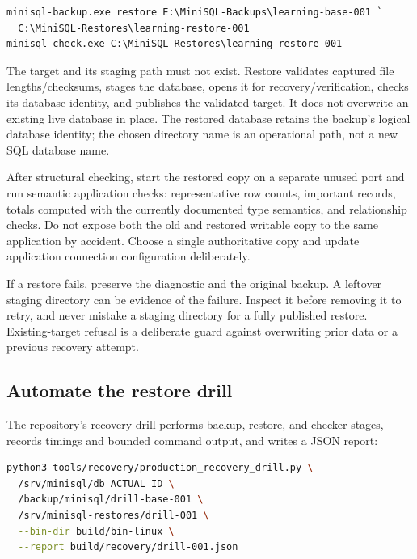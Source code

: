\begin{lstlisting}
minisql-backup.exe restore E:\MiniSQL-Backups\learning-base-001 `
  C:\MiniSQL-Restores\learning-restore-001
minisql-check.exe C:\MiniSQL-Restores\learning-restore-001
\end{lstlisting}

The target and its  staging path must not exist. Restore
validates captured file lengths/checksums, stages the database, opens it for
recovery/verification, checks its database identity, and publishes the
validated target. It does not overwrite an existing live database in place.
The restored database retains the backup's logical database identity; the
chosen directory name is an operational path, not a new SQL database name.

After structural checking, start the restored copy on a separate unused port
and run semantic application checks: representative row counts, important
records, totals computed with the currently documented type semantics, and
relationship checks. Do not expose both the old and restored writable copy to
the same application by accident. Choose a single authoritative copy and
update application connection configuration deliberately.

If a restore fails, preserve the diagnostic and the original backup. A
leftover staging directory can be evidence of the failure. Inspect it before
removing it to retry, and never mistake a staging directory for a fully
published restore. Existing-target refusal is a deliberate guard against
overwriting prior data or a previous recovery attempt.


\subsection{Automate the restore drill}

The repository's recovery drill performs backup, restore, and checker stages,
records timings and bounded command output, and writes a JSON report:

\begin{lstlisting}[language=bash]
python3 tools/recovery/production_recovery_drill.py \
  /srv/minisql/db_ACTUAL_ID \
  /backup/minisql/drill-base-001 \
  /srv/minisql-restores/drill-001 \
  --bin-dir build/bin-linux \
  --report build/recovery/drill-001.json
\end{lstlisting}

